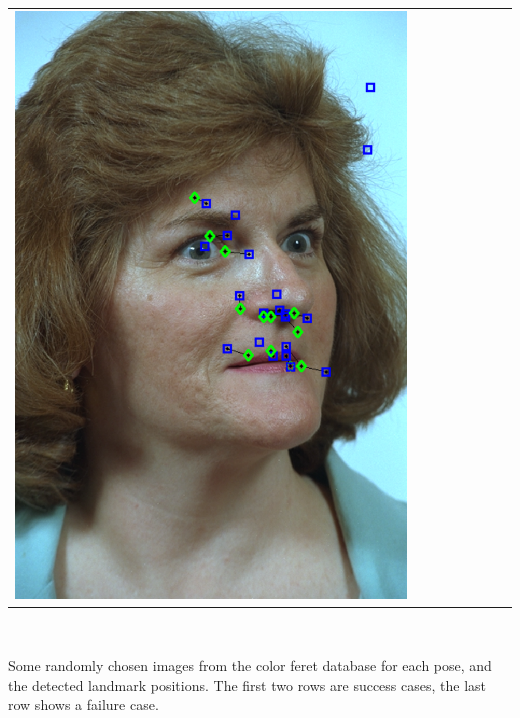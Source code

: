 \documentclass[portrait,final,a0paper,fontscale=0.277]{baposter}
\begin{document}
\begin{poster}
{{\begin{tabular}{@{}rccccccc@{}}
\parbox[c]{0.11\linewidth}{\includegraphics[width=\linewidth]{images/l_rc_fail.pdf}} 
\end{tabular}
  }\\[-1em]
      \begin{multicols}{2}
Some randomly chosen images from the color feret database for each
pose, and the detected landmark positions. The first two rows are success
cases, the last row shows a failure case. 
      \end{multicols}
}
\end{poster}
\end{document}
